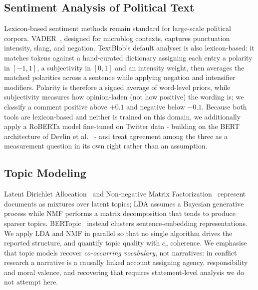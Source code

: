 \documentclass[pdflatex,sn-basic,Numbered,iicol]{sn-jnl}
\begin{document}
\subsection{Sentiment Analysis of Political Text}
Lexicon-based sentiment methods remain standard for large-scale political corpora.
VADER~\cite{hutto2014}, designed for microblog contexts, captures punctuation
intensity, slang, and negation. TextBlob's default analyser is also lexicon-based:
it matches tokens against a hand-curated dictionary assigning each entry a polarity
in $[-1,1]$, a subjectivity in $[0,1]$ and an intensity weight, then averages the
matched polarities across a sentence while applying negation and intensifier
modifiers. Polarity is therefore a signed average of word-level priors, while
subjectivity measures how opinion-laden (not how positive) the wording is; we
classify a comment positive above $+0.1$ and negative below $-0.1$. Because both
tools are lexicon-based and neither is trained on this domain, we additionally apply
a RoBERTa model fine-tuned on Twitter data - building on the BERT architecture of
Devlin et al.~\cite{devlin2019} - and treat agreement among the three as a
measurement question in its own right rather than an assumption.

\subsection{Topic Modeling}
Latent Dirichlet Allocation~\cite{blei2003} and Non-negative Matrix
Factorization~\cite{leeseung2000} represent documents as mixtures over latent
topics; LDA assumes a Bayesian generative process while NMF performs a matrix
decomposition that tends to produce sparser topics. BERTopic~\cite{grootendorst2022}
instead clusters sentence-embedding representations. We apply LDA and NMF in
parallel so that no single algorithm drives the reported structure, and quantify
topic quality with $c_v$ coherence. We emphasise
that topic models recover \emph{co-occurring vocabulary}, not narratives: in conflict
research a narrative is a causally linked account assigning agency, responsibility
and moral valence, and recovering that requires statement-level analysis we do not
attempt here.
\end{document}
